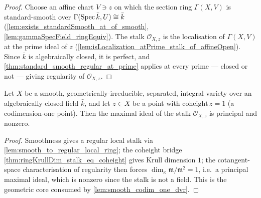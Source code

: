 \begin{proof}
  \leanok
  Choose an affine chart \(V \ni z\) on which the section ring
  \(\Gamma(X, V)\) is standard-smooth over
  \(\Gamma(\operatorname{Spec} \bar k, U) \cong \bar k\)
  (\cref{lem:exists_standardSmooth_at_of_smooth},
  \cref{lem:gammaSpecField_ringEquiv}). The stalk \(\mathcal O_{X,z}\) is the
  localisation of \(\Gamma(X, V)\) at the prime ideal of \(z\)
  (\cref{lem:isLocalization_atPrime_stalk_of_affineOpen}). Since \(\bar k\) is
  algebraically closed, it is perfect, and
  \cref{thm:standard_smooth_regular_at_prime} applies at every prime — closed
  or not — giving regularity of \(\mathcal O_{X,z}\).
\end{proof}

\begin{lemma}
  \label{lem:smooth_codim_one_maximalIdeal_principal}
  Let \(X\) be a smooth, geometrically-irreducible, separated, integral variety over an
  algebraically closed field \(\bar k\), and let \(z \in X\) be a point with
  \(\mathrm{coheight}\,z = 1\) (a codimension-one point). Then the maximal ideal of the
  stalk \(\mathcal O_{X,z}\) is principal and nonzero.
\end{lemma}

\begin{proof}
  Smoothness gives a regular local stalk via
  \cref{lem:smooth_to_regular_local_ring}; the coheight bridge
  \cref{thm:ringKrullDim_stalk_eq_coheight} gives Krull dimension \(1\); the
  cotangent-space characterisation of regularity then forces
  \(\dim_\kappa \mathfrak m/\mathfrak m^2 = 1\), i.e.\ a principal maximal ideal, which
  is nonzero since the stalk is not a field. This is the geometric core consumed by
  \cref{lem:smooth_codim_one_dvr}.
\end{proof}

